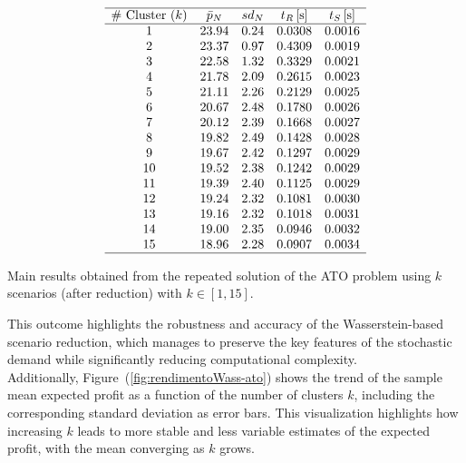 \documentclass[a4paper,12pt]{article}
\begin{document}
	\begin{table}[H]
	\[
	\begin{array}{ccccc}
		\hline
		\text{\# Cluster $(k)$} & \text{$\bar{p}_{N}$} & \text{$sd_{N}$} & \text{$t_{R}$\,[s]} & \text{$t_{S}$\,[s]} \\
		\hline
		1  & 23.94 & 0.24 & 0.0308 & 0.0016 \\
		2  & 23.37 & 0.97 & 0.4309 & 0.0019 \\
		3  & 22.58 & 1.32 & 0.3329 & 0.0021 \\
		4  & 21.78 & 2.09 & 0.2615 & 0.0023 \\
		5  & 21.11 & 2.26 & 0.2129 & 0.0025 \\
		6  & 20.67 & 2.48 & 0.1780 & 0.0026 \\
		7  & 20.12 & 2.39 & 0.1668 & 0.0027 \\
		8  & 19.82 & 2.49 & 0.1428 & 0.0028 \\
		9  & 19.67 & 2.42 & 0.1297 & 0.0029 \\
		10 & 19.52 & 2.38 & 0.1242 & 0.0029 \\
		11 & 19.39 & 2.40 & 0.1125 & 0.0029 \\
		12 & 19.24 & 2.32 & 0.1081 & 0.0030 \\
		13 & 19.16 & 2.32 & 0.1018 & 0.0031 \\
		14 & 19.00 & 2.35 & 0.0946 & 0.0032 \\
		15 & 18.96 & 2.28 & 0.0907 & 0.0034 \\
		\hline
	\end{array}
	\]
	\caption{Main results obtained from the repeated solution of the ATO problem using $k$ scenarios (after reduction) with $k \in [1,15]$.}
	\label{tab:wass-ato-results}
	\end{table}
	This outcome highlights the robustness and accuracy of the Wasserstein-based scenario reduction, which manages to preserve the key features of the stochastic demand while significantly reducing computational complexity.\\
	
	\noindent
	Additionally, Figure~(\ref{fig:rendimentoWass-ato}) shows the trend of the sample mean expected profit as a function of the number of clusters $k$, including the corresponding standard deviation as error bars. This visualization highlights how increasing $k$ leads to more stable and less variable estimates of the expected profit, with the mean converging as $k$ grows.
	
\end{document}
